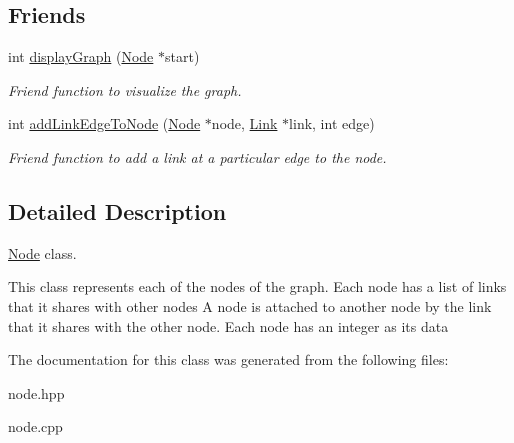 \subsection*{Friends}
\begin{DoxyCompactItemize}
\item 
\hypertarget{classNode_a6a3a35dc10c66f0658f4003074059fcd}{int \hyperlink{classNode_a6a3a35dc10c66f0658f4003074059fcd}{display\-Graph} (\hyperlink{classNode}{Node} $\ast$start)}\label{classNode_a6a3a35dc10c66f0658f4003074059fcd}

\begin{DoxyCompactList}\small\item\em Friend function to visualize the graph. \end{DoxyCompactList}\item 
\hypertarget{classNode_a1cccce22df97e21e1e0e0cd3ca6526b0}{int \hyperlink{classNode_a1cccce22df97e21e1e0e0cd3ca6526b0}{add\-Link\-Edge\-To\-Node} (\hyperlink{classNode}{Node} $\ast$node, \hyperlink{classLink}{Link} $\ast$link, int edge)}\label{classNode_a1cccce22df97e21e1e0e0cd3ca6526b0}

\begin{DoxyCompactList}\small\item\em Friend function to add a link at a particular edge to the node. \end{DoxyCompactList}\end{DoxyCompactItemize}


\subsection{Detailed Description}
\hyperlink{classNode}{Node} class. 

This class represents each of the nodes of the graph. Each node has a list of links that it shares with other nodes A node is attached to another node by the link that it shares with the other node. Each node has an integer as its data 

The documentation for this class was generated from the following files\-:\begin{DoxyCompactItemize}
\item 
node.\-hpp\item 
node.\-cpp\end{DoxyCompactItemize}
